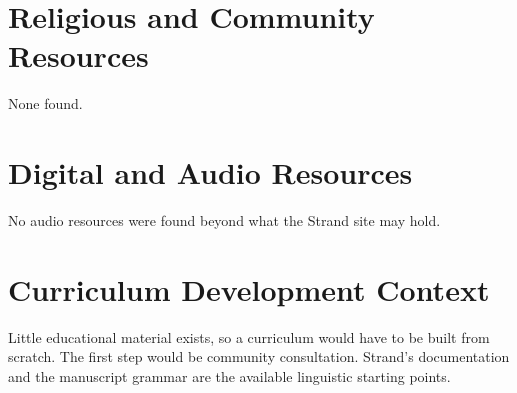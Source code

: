 \documentclass[12pt]{article}
\begin{document}
\section{Religious and Community Resources}
None found.

\section{Digital and Audio Resources}
No audio resources were found beyond what the Strand site may hold.

\section{Curriculum Development Context}
Little educational material exists, so a curriculum would have to be built from scratch. The first step would be community consultation. Strand's documentation and the manuscript grammar are the available linguistic starting points.
\end{document}
